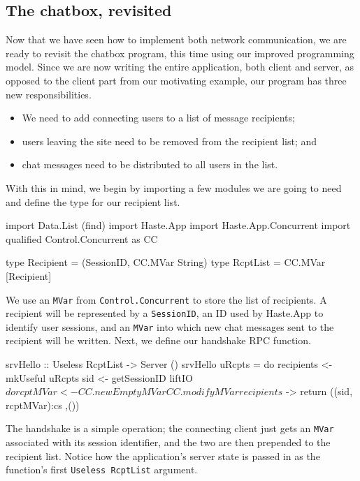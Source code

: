 \documentclass[preprint]{sigplanconf}
\begin{document}
\subsection{The chatbox, revisited}

Now that we have seen how to implement both network communication, we are ready
to revisit the chatbox program, this time using our improved programming model.
Since we are now writing the entire application, both client and server, as
opposed to the client part from our motivating example, our program has three
new responsibilities.

\begin{itemize}
  \item We need to add connecting users to a list of message recipients;
  \item users leaving the site need to be removed from the recipient list; and
  \item chat messages need to be distributed to all users in the list.
\end{itemize}

With this in mind, we begin by importing a few modules we are going to need and
define the type for our recipient list.

\begin{code}
import Data.List (find)
import Haste.App
import Haste.App.Concurrent
import qualified Control.Concurrent as CC

type Recipient = (SessionID, CC.MVar String)
type RcptList = CC.MVar [Recipient]
\end{code}

We use an \lstinline!MVar! from \lstinline!Control.Concurrent! to store the
list of recipients. A recipient will be represented by a \lstinline!SessionID!,
an ID used by Haste.App to identify user sessions, and an \lstinline!MVar! into
which new chat messages sent to the recipient will be written. Next, we define
our handshake RPC function.

\begin{code}
srvHello :: Useless RcptList -> Server ()
srvHello uRcpts = do
  recipients <- mkUseful uRcpts
  sid <- getSessionID
  liftIO $ do
    rcptMVar <- CC.newEmptyMVar
    CC.modifyMVar recipients $ \cs ->
      return ((sid, rcptMVar):cs ,())
\end{code}

The handshake is a simple operation; the connecting client just gets an
\lstinline!MVar! associated with its session identifier, and the two are then
prepended to the recipient list. Notice how the application's server state is
passed in as the function's first \lstinline!Useless RcptList! argument.
\end{document}
